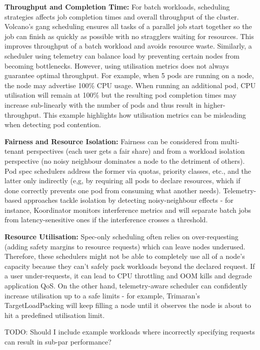 \textbf{Throughput and Completion Time:} For batch workloads, scheduling
strategies affects job completion times and overall throughput of the cluster.
Volcano's \cite{} gang scheduling ensures all tasks of a parallel job start
together so the job can finish as quickly as possible with no stragglers waiting
for resources. This improves throughput of a batch workload and avoids resource
waste. Similarly, a scheduler using telemetry can balance load by preventing
certain nodes from becoming bottlenecks. However, using utilisation metrics does
not always guarantee optimal throughput. For example, when 5 pods are running on
a node, the node may advertise 100\% CPU usage. When running an additional pod,
CPU utilisation will remain at 100\% but the resulting pod completion times
may increase sub-linearly with the number of pods and thus result in
higher-throughput. This example highlights how utilisation metrics can be
misleading when detecting pod contention.

\textbf{Fairness and Resource Isolation:} Fairness can be considered from
multi-tenant perspectives (each user gets a fair share) and from a workload
isolation perspective (no noisy neighbour dominates a node to the detriment of
others). Pod spec schedulers address the former via quotas, priority classes,
etc., and the latter only indirectly (e,g, by requiring all pods to declare
resources, which if done correctly prevents one pod from consuming what another
needs). Telemetry-based approaches tackle isolation by detecting noisy-neighbour
effects - for instance, Koordinator monitors interference metrics and will
separate batch jobs from latency-senesitive ones if the interference crosses a
threshold.

\textbf{Resource Utilisation:} Spec-only scheduling often relies on
over-requesting (adding safety margins to resource requests) which can leave
nodes underused. Therefore, these schedulers might not be able to
completely use all of a node's capacity because they can't safely pack workloads
beyond the declared request. If a user under-requests, it can lead to CPU
throttling and OOM kills and degrade application QoS. On the other hand,
telemetry-aware scheduler can confidently increase utilisation up to a safe
limits - for example, Trimaran's TargetLoadPacking will keep filling a node
until it observes the node is about to hit a predefined utilisation limit.

TODO: Should I include example workloads where incorrectly specifying requests
can result in sub-par performance?


